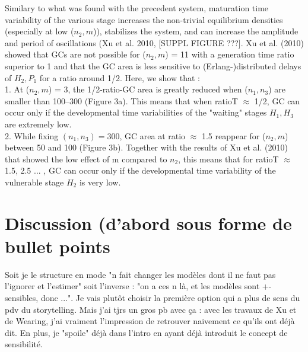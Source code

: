 \documentclass[12pt,a4paper,onecolumn]{article}
\begin{document}
\tabto{1 cm} Similary to what was found with the precedent system, maturation time variability of the various stage increases the non-trivial equilibrium densities (especially at low ($n_2, m$)), stabilizes the system, and can increase the amplitude and period of oscillations (Xu et al. 2010, [SUPPL FIGURE ???]. 
\tabto{1 cm} Xu et al. (2010) showed that GCs are not possible for ($n_2,m$) = 11 with a generation time ratio superior to 1 and that the GC area is less sensitive to (Erlang-)distributed delays of $H_2, P_1$ for a ratio around 1/2. Here, we show that : \\
\tabto{1.5 cm} 1. At ($n_2,m$) = 3, the 1/2-ratio-GC area is greatly reduced when ($n_1, n_3$) are smaller than 100--300 (Figure 3a). This means that when ratioT $\approx$ 1/2, GC can occur only if the developmental time variabilities of the "waiting" stages $H_1, H_3$ are extremely low. \\
\tabto{1.5 cm} 2. While fixing $(n_1, n_3) = 300$, GC area at ratio $\approx$ 1.5 reappear for ($n_2,m$) between 50 and 100 (Figure 3b). Together with the results of Xu et al. (2010) that showed the low effect of m compared to $n_2$, this means that for ratioT $\approx$ 1.5, 2.5 ... , GC can occur only if the developmental time variability of the vulnerable stage $H_2$ is very low. \\
























\section{Discussion (d'abord sous forme de bullet points}
Soit je le structure en mode "n fait changer les modèles dont il ne faut pas l'ignorer et l'estimer" soit l'inverse : "on a ces n là, et les modèles sont +- sensibles, donc ...". Je vais plutôt choisir la première option qui a plus de sens du pdv du storytelling. Mais j'ai tjrs un gros pb avec ça : avec les travaux de Xu et de Wearing, j'ai vraiment l'impression de retrouver naivement ce qu'ils ont déjà dit. En plus, je "spoile" déjà dans l'intro en ayant déjà introduit le concept de sensibilité.
\end{document}
